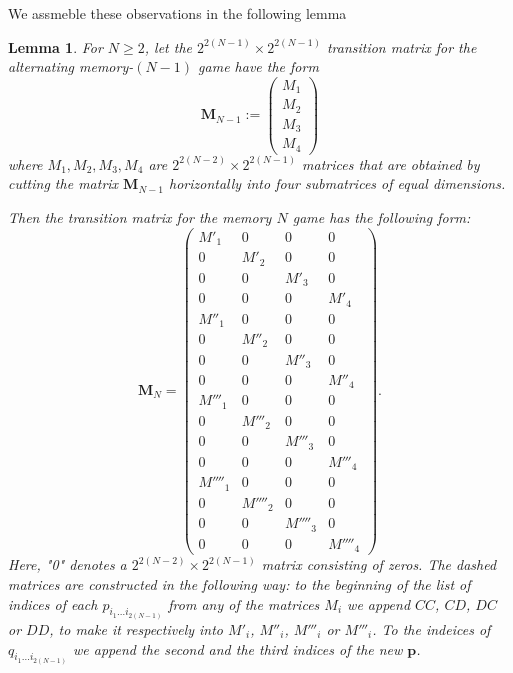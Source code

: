 \documentclass{article}
\def\p{\mathbf{p}}
\newtheorem{lemma}[theorem]{Lemma}
\theoremstyle{definition}
\numberwithin{equation}{section}
\begin{document}
We assmeble these observations in the following lemma

\begin{lemma}
\label{lem: construction matrix}
For $N\!\ge\!2$, let the $2^{2(N-1)}\times2^{2(N-1)}$ transition matrix for the alternating memory-$(N\!-\!1)$ game have the form
\begin{equation}
    \label{eq: memory N-1 matrix}
  \mathbf{M}_{N-1}:=  \begin{pmatrix}
        M_1\\
        M_2\\
        M_3\\
        M_4
    \end{pmatrix}
\end{equation}
where $M_1, M_2, M_3, M_4$ are $2^{2(N-2)}\times2^{2(N-1)}$ matrices that are obtained by  cutting the matrix $\mathbf{M}_{N-1}$ horizontally into four submatrices of equal dimensions. 

Then the  transition  matrix for the  memory $N$ game has the following form:
\begin{equation}
    \label{eq: memory N matrix}
 \mathbf{M}_N  =   \begin{pmatrix}
        M'_1& 0& 0&0\\
        0&M'_2&0&0\\
        0&0&M'_3&0\\
        0&0&0&M'_4\\
        M''_1& 0& 0&0\\
        0&M''_2&0&0\\
        0&0&M''_3&0\\
        0&0&0&M''_4\\
        M'''_1& 0& 0&0\\
        0&M'''_2&0&0\\
        0&0&M'''_3&0\\
        0&0&0&M'''_4\\
        M''''_1& 0& 0&0\\
        0&M''''_2&0&0\\
        0&0&M''''_3&0\\
        0&0&0&M''''_4
    \end{pmatrix}.
\end{equation}
Here,  "0" denotes a $2^{2(N-2)}\times2^{2(N-1)}$  matrix consisting of zeros. The dashed matrices are constructed in the following way: to the beginning of the list of indices of each $p_{i_1\ldots i_{2(N-1)}}$ from any of the matrices $M_i$ we append   $CC$, $CD$, $DC$ or $DD$, to make it respectively into $M'_i$, $M''_i$, $M'''_i$ or $M'''_i$. To  the indeices of $q_{i_1\ldots i_{2(N-1)}}$  we append the second and the third indices of the new $\p$. 
\end{lemma}
\end{document}
